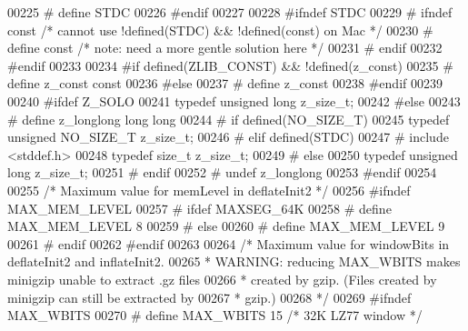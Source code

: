 \begin{DoxyCode}
00225 \textcolor{preprocessor}{#  define STDC}
00226 \textcolor{preprocessor}{#endif}
00227 
00228 \textcolor{preprocessor}{#ifndef STDC}
00229 \textcolor{preprocessor}{#  ifndef const }\textcolor{comment}{/* cannot use !defined(STDC) && !defined(const) on Mac */}\textcolor{preprocessor}{}
00230 \textcolor{preprocessor}{#    define const       }\textcolor{comment}{/* note: need a more gentle solution here */}\textcolor{preprocessor}{}
00231 \textcolor{preprocessor}{#  endif}
00232 \textcolor{preprocessor}{#endif}
00233 
00234 \textcolor{preprocessor}{#if defined(ZLIB\_CONST) && !defined(z\_const)}
00235 \textcolor{preprocessor}{#  define z\_const const}
00236 \textcolor{preprocessor}{#else}
00237 \textcolor{preprocessor}{#  define z\_const}
00238 \textcolor{preprocessor}{#endif}
00239 
00240 \textcolor{preprocessor}{#ifdef Z\_SOLO}
00241    \textcolor{keyword}{typedef} \textcolor{keywordtype}{unsigned} \textcolor{keywordtype}{long} z\_size\_t;
00242 \textcolor{preprocessor}{#else}
00243 \textcolor{preprocessor}{#  define z\_longlong long long}
00244 \textcolor{preprocessor}{#  if defined(NO\_SIZE\_T)}
00245      \textcolor{keyword}{typedef} \textcolor{keywordtype}{unsigned} NO\_SIZE\_T z\_size\_t;
00246 \textcolor{preprocessor}{#  elif defined(STDC)}
00247 \textcolor{preprocessor}{#    include <stddef.h>}
00248      \textcolor{keyword}{typedef} \textcolor{keywordtype}{size\_t} z\_size\_t;
00249 \textcolor{preprocessor}{#  else}
00250      \textcolor{keyword}{typedef} \textcolor{keywordtype}{unsigned} \textcolor{keywordtype}{long} z\_size\_t;
00251 \textcolor{preprocessor}{#  endif}
00252 \textcolor{preprocessor}{#  undef z\_longlong}
00253 \textcolor{preprocessor}{#endif}
00254 
00255 \textcolor{comment}{/* Maximum value for memLevel in deflateInit2 */}
00256 \textcolor{preprocessor}{#ifndef MAX\_MEM\_LEVEL}
00257 \textcolor{preprocessor}{#  ifdef MAXSEG\_64K}
00258 \textcolor{preprocessor}{#    define MAX\_MEM\_LEVEL 8}
00259 \textcolor{preprocessor}{#  else}
00260 \textcolor{preprocessor}{#    define MAX\_MEM\_LEVEL 9}
00261 \textcolor{preprocessor}{#  endif}
00262 \textcolor{preprocessor}{#endif}
00263 
00264 \textcolor{comment}{/* Maximum value for windowBits in deflateInit2 and inflateInit2.}
00265 \textcolor{comment}{ * WARNING: reducing MAX\_WBITS makes minigzip unable to extract .gz files}
00266 \textcolor{comment}{ * created by gzip. (Files created by minigzip can still be extracted by}
00267 \textcolor{comment}{ * gzip.)}
00268 \textcolor{comment}{ */}
00269 \textcolor{preprocessor}{#ifndef MAX\_WBITS}
00270 \textcolor{preprocessor}{#  define MAX\_WBITS   15 }\textcolor{comment}{/* 32K LZ77 window */}\textcolor{preprocessor}{}

\end{DoxyCode}
